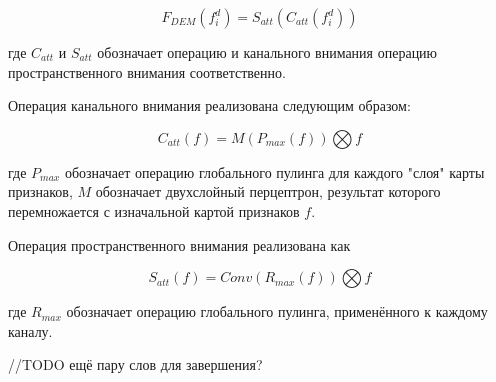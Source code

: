 \begin{equation}
    F_{DEM}(f_i^d)=S_{att}(C_{att}(f_i^d))
\end{equation}

где $C_{att}$ и $S_{att}$ обозначает операцию и канального внимания операцию пространственного внимания
 соответственно.

Операция канального внимания реализована следующим образом:

\begin{equation}
    C_{att}(f)=M(P_{max}(f)) \bigotimes f
\end{equation}

где $P_{max}$ обозначает операцию глобального пулинга для каждого "слоя"
карты признаков, $M$ обозначает двухслойный перцептрон, 
результат которого перемножается с изначальной картой признаков $f$.

Операция пространственного внимания реализована как 

\begin{equation}
    S_{att}(f)=Conv(R_{max}(f)) \bigotimes f
\end{equation}

где $R_{max}$ обозначает операцию глобального пулинга, применённого к 
каждому каналу.

//TODO ещё пару слов для завершения?